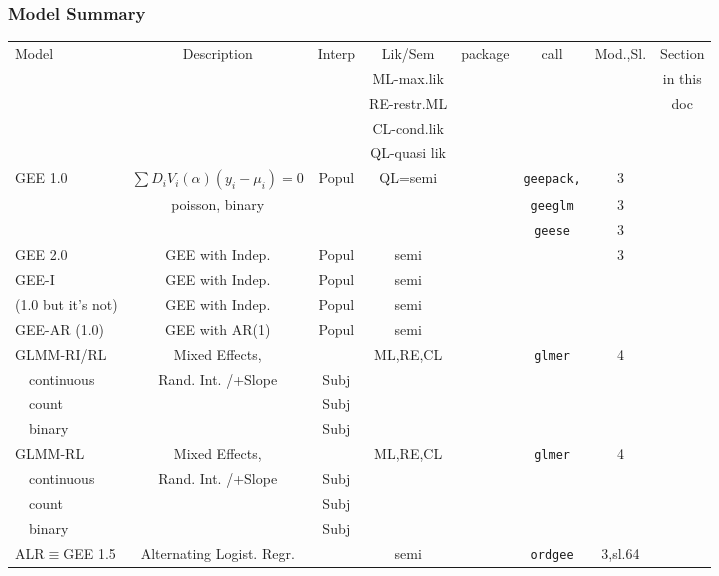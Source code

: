 \documentclass[]{article}
\begin{document}
	\subsubsection{Model Summary}
	\begin{tabular}{|l|| c| c | c |c|c|c|c}
	  \hline
	  \hline
	  Model & Description & Interp & Lik/Sem  & package & call & Mod.,Sl. & Section\\
	    &   &   & ML-max.lik  &   &   &   &  in this  \\
	    &   &   & RE-restr.ML  &   &   &   &   doc\\
	    &   &   & CL-cond.lik  &    &   &   &  \\
	    &   &   & QL-quasi lik  &    &   &   &  \\
	  \hline
	  \hline
	  GEE 1.0 &  $\sum D_i V_i(\alpha) (y_i - \mu_i) = 0$  & Popul& QL=semi &  &   \texttt{geepack,}   & 3   &       \\
	    &   poisson, binary  &  &   &  &   \texttt{geeglm}   & 3   &       \\
	    &       &  &   &  &   \texttt{geese}   & 3   &       \\
	  \hline
	  GEE 2.0 & GEE with Indep.  & Popul&semi  &   &      &  3  &       \\
	  \hline
	  GEE-I & GEE with Indep.  & Popul&semi  &   &    &    &       \\
	  (1.0 but it's not) & GEE with Indep.  & Popul&semi  &   &    &    &       \\
	  \hline
	  GEE-AR (1.0) & GEE with AR(1)  & Popul&semi  &   &    &     &      \\
	  \hline
	  GLMM-RI/RL & Mixed Effects,  &  & ML,RE,CL  &  &  \texttt{glmer}   &  4  &      \\
	     ~~continuous &    Rand. Int. /+Slope & Subj&   &   &   &    &      \\
	     ~~count &     & Subj&   &   &   &    &      \\
	     ~~binary &    & Subj&  &   &   &    &      \\
	  \hline
	  GLMM-RL & Mixed Effects,    &   & ML,RE,CL &  & \texttt{glmer}  & 4   &      \\
	   ~~continuous &   Rand. Int. /+Slope  &  Subj& &   &   &    &      \\
	   ~~count &    &  Subj&   &   &   &    &      \\
	   ~~binary &     &  Subj&   &   &   &    &      \\
	  \hline
	  ALR$\equiv$GEE 1.5 & Alternating Logist. Regr.  &  &semi &   &  \texttt{ordgee}  &  3,sl.64   &     \\

\end{tabular}
\end{document}
